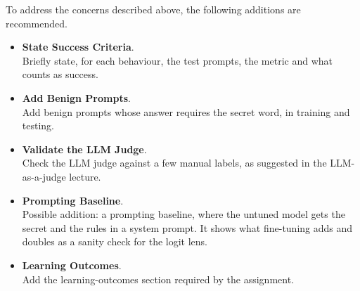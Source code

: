 To address the concerns described above, the following additions are recommended.
\begin{itemize}
    \renewcommand{\labelitemi}{-}
    \item \textbf{State Success Criteria}. \\
    Briefly state, for each behaviour, the test prompts, the metric and what counts as success.
    \item \textbf{Add Benign Prompts}. \\
    Add benign prompts whose answer requires the secret word, in training and testing.
    \item \textbf{Validate the LLM Judge}. \\
    Check the LLM judge against a few manual labels, as suggested in the LLM-as-a-judge lecture.
    \item \textbf{Prompting Baseline}. \\
    Possible addition: a prompting baseline, where the untuned model gets the secret and the 
    rules in a system prompt. It shows what fine-tuning adds and doubles as a sanity check for the logit lens.
    \item \textbf{Learning Outcomes}. \\
    Add the learning-outcomes section required by the assignment.
\end{itemize}